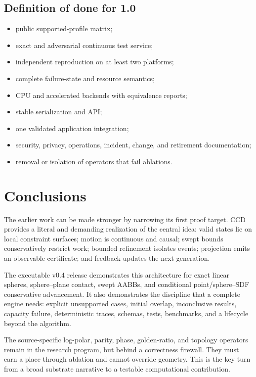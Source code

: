 \documentclass[11pt,a4paper,openany]{book}
\begin{document}
\section{Definition of done for 1.0}
\begin{itemize}
  \item public supported-profile matrix;
  \item exact and adversarial continuous test service;
  \item independent reproduction on at least two platforms;
  \item complete failure-state and resource semantics;
  \item CPU and accelerated backends with equivalence reports;
  \item stable serialization and API;
  \item one validated application integration;
  \item security, privacy, operations, incident, change, and retirement documentation;
  \item removal or isolation of operators that fail ablations.
\end{itemize}

\chapter{Conclusions}
The earlier work can be made stronger by narrowing its first proof target. CCD provides a literal and demanding realization of the central idea: valid states lie on local constraint surfaces; motion is continuous and causal; swept bounds conservatively restrict work; bounded refinement isolates events; projection emits an observable certificate; and feedback updates the next generation.

The executable v0.4 release demonstrates this architecture for exact linear spheres, sphere--plane contact, swept AABBs, and conditional point/sphere--SDF conservative advancement. It also demonstrates the discipline that a complete engine needs: explicit unsupported cases, initial overlap, inconclusive results, capacity failure, deterministic traces, schemas, tests, benchmarks, and a lifecycle beyond the algorithm.

The source-specific log-polar, parity, phase, golden-ratio, and topology operators remain in the research program, but behind a correctness firewall. They must earn a place through ablation and cannot override geometry. This is the key turn from a broad substrate narrative to a testable computational contribution.
\end{document}
